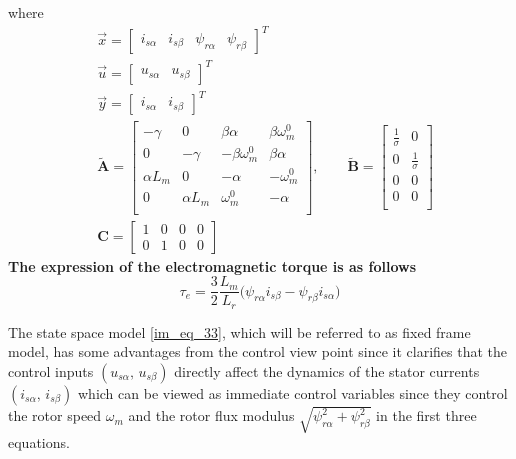 \documentclass[12pt,a4paper,oneside]{book}
\begin{document}
\begin{onehalfspace}
\begin{mybox}
\begin{equation}
	\end{equation}
	where
	\begin{equation}\label{im_eq_37}
		\begin{aligned}
			&\vec{x} = \begin{bmatrix} 
				i_{s\alpha}&i_{s\beta}&\psi_{r\alpha}&\psi_{r\beta} 
			\end{bmatrix}^T\\[6pt]
			&\vec{u} = \begin{bmatrix} u_{s\alpha}&u_{s\beta} 
			\end{bmatrix}^T\\[6pt]
			&\vec{y} = \begin{bmatrix} i_{s\alpha}&i_{s\beta} 
			\end{bmatrix}^T\\[6pt]
			&\tilde{\mathbf{A}} = \begin{bmatrix}
				-\gamma&0&\beta\alpha&\beta\omega_m^0 \\[6pt]			
				0&-\gamma&-\beta\omega_m^0&\beta\alpha \\[6pt]
				\alpha L_m&0&-\alpha&-\omega_m^0 \\[6pt]
				0&\alpha L_m&\omega_m^0&-\alpha \\[6pt]
			\end{bmatrix},\qquad
			\tilde{\mathbf{B}} = \begin{bmatrix}
				\frac{1}{\sigma}&0 \\[6pt]			
				0&\frac{1}{\sigma} \\[6pt]
				0&0 \\[6pt]
				0&0 \\[6pt]
			\end{bmatrix} \\[6pt]
			&\mathbf{C} = \begin{bmatrix}
				1&0&0&0 \\[6pt]			
				0&1&0&0	
			\end{bmatrix}
		\end{aligned}
	\end{equation}
	\textbf{The expression of the electromagnetic torque is as follows}
	\begin{equation}\label{im_eq_38}
		\tau_e = \frac{3}{2}\frac{L_m}{L_r}\Big(\psi_{r\alpha}i_{s\beta} - 
		\psi_{r\beta}i_{s\alpha}\Big)
	\end{equation}
\end{mybox}

The state space model \ref{im_eq_33}, which will be referred to as fixed frame 
model, has some advantages from the control view point since it clarifies that 
the control inputs $\left(u_{s\alpha},\, u_{s\beta}\right)$ directly affect the 
dynamics of the stator currents $\left(i_{s\alpha},\, i_{s\beta}\right)$ which 
can be viewed as immediate control variables since they control the rotor speed 
$\omega_m$ and the rotor flux modulus $\sqrt{\psi_{r\alpha}^2 + 
	\psi_{r\beta}^2}$ in the first three equations.


\end{onehalfspace}
\end{document}
